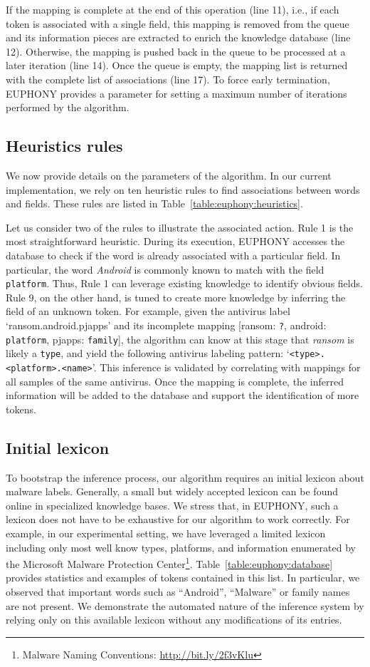 If the mapping is complete at the end of this operation (line 11), i.e.,
if each token is associated with a single field, this mapping is removed from the queue and its information pieces are extracted to enrich the knowledge database (line 12).
Otherwise, the mapping is pushed back in the queue to be processed at a later iteration (line 14).
Once the queue is empty, the mapping list is returned with the complete list of associations (line 17).
To force early termination, EUPHONY provides a parameter for setting a maximum number of iterations performed by the algorithm.
\subsection{Heuristics rules}
We now provide details on the parameters of the algorithm.
In our current implementation, we rely on ten heuristic rules to find associations between words and fields.
These rules are listed in Table~\ref{table:euphony:heuristics}.



Let us consider two of the rules to illustrate the associated action.
Rule 1 is the most straightforward heuristic.
During its execution, EUPHONY accesses the database to check if the word is already associated with a particular field.
In particular, the word {\em Android} is commonly known to match with the field \texttt{platform}.
Thus, Rule 1 can leverage existing knowledge to identify obvious fields.
Rule 9, on the other hand, is tuned to create more knowledge by inferring the field of an unknown token.
For example, given the antivirus label `ransom.android.pjapps' and its incomplete mapping [ransom: \texttt{?}, android: \texttt{platform}, pjapps: \texttt{family}], the algorithm can know at this stage that {\em ransom} is likely a \texttt{type}, and yield the following antivirus labeling pattern: `\texttt{<type>.<platform>.<name>}'.
This inference is validated by correlating with mappings for all samples of the same antivirus.
Once the mapping is complete, the inferred information will be added to the database and support the identification of more tokens.
\subsection{Initial lexicon}
To bootstrap the inference process, our algorithm requires an initial lexicon about malware labels.
Generally, a small but widely accepted lexicon can be found online in specialized knowledge bases.
We stress that, in EUPHONY, such a lexicon does not have to be exhaustive for our algorithm to work correctly.
For example, in our experimental setting, we have leveraged a limited lexicon including only most well know types, platforms, and information enumerated by the Microsoft Malware Protection Center\footnote{Malware Naming Conventions: \url{http://bit.ly/2f3vKlu}}.
Table~\ref{table:euphony:database} provides statistics and examples of tokens contained in this list.
In particular, we observed that important words such as ``Android'', ``Malware'' or family names are not present.
We demonstrate the automated nature of the inference system by relying only on this available lexicon without any modifications of its entries.

